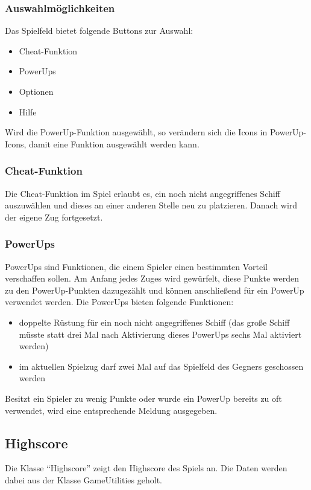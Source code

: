 \documentclass[11pt]{article} %
\begin{document}
\subsubsection{Auswahlmöglichkeiten}
Das Spielfeld bietet folgende Buttons zur Auswahl:
\begin{itemize}
\item Cheat-Funktion
\item PowerUps
\item Optionen
\item Hilfe
\end{itemize}
Wird die PowerUp-Funktion ausgewählt, so verändern sich die Icons in PowerUp-Icons, damit eine Funktion ausgewählt werden kann.

\subsubsection{Cheat-Funktion}
Die Cheat-Funktion im Spiel erlaubt es, ein noch nicht angegriffenes Schiff auszuwählen und dieses an einer anderen Stelle neu zu platzieren. Danach wird der eigene Zug fortgesetzt.

\subsubsection{PowerUps}
PowerUps sind Funktionen, die einem Spieler einen bestimmten Vorteil verschaffen sollen. Am Anfang jedes Zuges wird gewürfelt, diese Punkte werden zu den PowerUp-Punkten dazugezählt und können anschließend für ein PowerUp verwendet werden.
Die PowerUps bieten folgende Funktionen:
\begin{itemize}
\item doppelte Rüstung für ein noch nicht angegriffenes Schiff (das große Schiff müsste statt drei Mal nach Aktivierung dieses PowerUps sechs Mal aktiviert werden)
\item im aktuellen Spielzug darf zwei Mal auf das Spielfeld des Gegners geschossen werden
\end{itemize}

Besitzt ein Spieler zu wenig Punkte oder wurde ein PowerUp bereits zu oft verwendet, wird eine entsprechende Meldung ausgegeben.

\subsection{Highscore}
Die Klasse \enquote{Highscore} zeigt den Highscore des Spiels an. Die Daten werden dabei aus der Klasse GameUtilities geholt.
\end{document}
